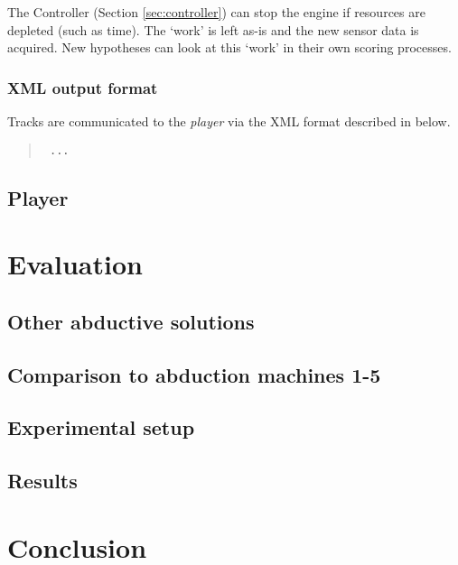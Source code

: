 \documentclass{book}
\begin{document}
The Controller (Section \ref{sec:controller}) can stop the engine if resources
are depleted (such as time). The `work' is left as-is and the new sensor data is
acquired. New hypotheses can look at this `work' in their own scoring processes.

\subsection{XML output format}

Tracks are communicated to the \emph{player} via the XML format described in
below.

\begin{quote}
{\tt
...
}
\end{quote}

\section{Player}
\label{sec:player}

\chapter{Evaluation}

\section{Other abductive solutions}

\section{Comparison to abduction machines 1-5}

\section{Experimental setup}

\section{Results}

\chapter{Conclusion}
\end{document}
